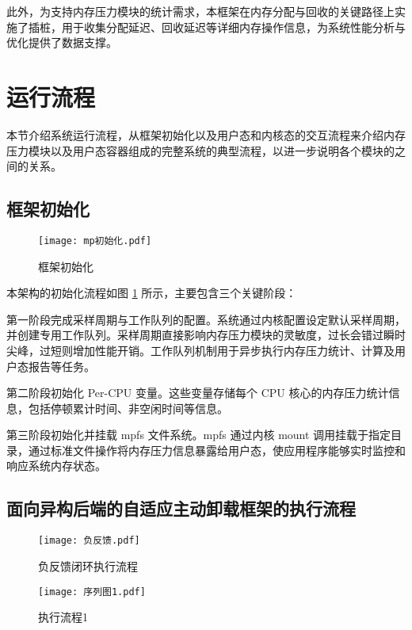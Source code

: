 此外，为支持内存压力模块的统计需求，本框架在内存分配与回收的关键路径上实施了插桩，用于收集分配延迟、回收延迟等详细内存操作信息，为系统性能分析与优化提供了数据支撑。


\section{运行流程}

本节介绍系统运行流程，从框架初始化以及用户态和内核态的交互流程来介绍内存压力模块以及用户态容器组成的完整系统的典型流程，以进一步说明各个模块的之间的关系。

\subsection{框架初始化}

\begin{figure}[htb]
    \centering
    \texttt{[image: mp初始化.pdf]}
    \caption{框架初始化}
    \label{fig:framework_initialization}
\end{figure}

本架构的初始化流程如图 \ref{fig:framework_initialization} 所示，主要包含三个关键阶段：

第一阶段完成采样周期与工作队列的配置。系统通过内核配置设定默认采样周期，并创建专用工作队列。采样周期直接影响内存压力模块的灵敏度，过长会错过瞬时尖峰，过短则增加性能开销。工作队列机制用于异步执行内存压力统计、计算及用户态报告等任务。

第二阶段初始化 Per-CPU 变量。这些变量存储每个 CPU 核心的内存压力统计信息，包括停顿累计时间、非空闲时间等信息。

第三阶段初始化并挂载 mpfs 文件系统。mpfs 通过内核 mount 调用挂载于指定目录，通过标准文件操作将内存压力信息暴露给用户态，使应用程序能够实时监控和响应系统内存状态。

\subsection{面向异构后端的自适应主动卸载框架的执行流程}
\label{sec:面向异构后端的自适应主动卸载框架的执行流程}

\begin{figure}[htb]
\centering
\texttt{[image: 负反馈.pdf]}
\caption{负反馈闭环执行流程}
\label{fig:feedback_loop}
\end{figure}

\begin{figure}[htb]
\centering
\texttt{[image: 序列图1.pdf]}
\caption{执行流程1}
\label{fig:kernel_sequence_diagram_1}
\end{figure}

